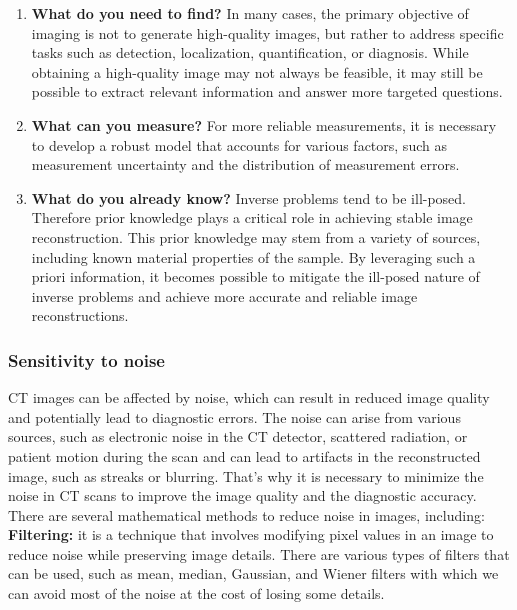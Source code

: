 \documentclass{article}
\begin{document}
\begin{tcolorbox}[colback=seashell,colframe=beaublue,title= The Three Important Questions of Inverse Problems]
\begin{enumerate}
	\item \textbf{What do you need to find?} In many cases, the primary objective of imaging is not to generate high-quality images, but rather to address specific tasks such as detection, localization, quantification, or diagnosis. While obtaining a high-quality image may not always be feasible, it may still be possible to extract relevant information and answer more targeted questions. 
	\item \textbf{What can you measure?} For more reliable measurements, it is necessary to develop a robust model that accounts for various factors, such as measurement uncertainty and the distribution of measurement errors.
	\item \textbf{What do you already know?} Inverse problems tend to be ill-posed. Therefore prior knowledge plays a critical role in achieving stable image reconstruction. This prior knowledge may stem from a variety of sources, including known material properties of the sample. By leveraging such a priori information, it becomes possible to mitigate the ill-posed nature of inverse problems and achieve more accurate and reliable image reconstructions.

\end{enumerate}
\end{tcolorbox}
\subsubsection{Sensitivity to noise}
CT images can be affected by noise, which can result in reduced image quality and potentially lead to diagnostic errors.
\newline 
The noise can arise from various sources, such as electronic noise in the CT detector, scattered radiation, or patient motion during the scan and can lead to
artifacts in the reconstructed image, such as streaks or blurring.
\newline
That's why it is necessary to minimize the noise in CT scans to improve the image quality and the diagnostic accuracy.		 
\newline 
There are several mathematical methods to reduce noise in images, including:
\newline
\textbf{Filtering:} it is a technique that involves modifying pixel values in an image to reduce noise while preserving image details. There are various types of filters that can be used, such as mean, median, Gaussian, and Wiener filters with which we can avoid most of the noise at the cost of
losing some details.
\end{document}
